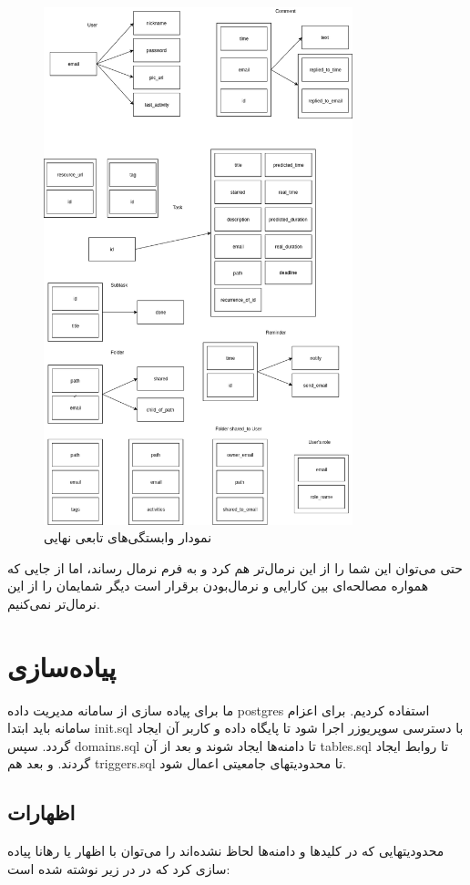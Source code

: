 \documentclass{article}
\begin{document}
\begin{figure}[H]
  \centering  
  \includegraphics[width = 0.8\textwidth]{Fucntional_Dependancy2.png}
  \caption{نمودار وابستگی‌های تابعی نهایی}
  \label{fig:fd2}
\end{figure}
حتی می‌توان این شما را از این نرمال‌تر هم کرد و به فرم نرمال  رساند، اما از جایی که همواره مصالحه‌ای بین کارایی و نرمال‌بودن برقرار است دیگر شمایمان را از این نرمال‌تر نمی‌کنیم.
\section*{پیاده‌سازی}
ما برای پیاده سازی از سامانه مدیریت داده postgres استفاده کردیم. برای اعزام سامانه باید ابتدا init.sql با دسترسی سوپریوزر اجرا شود تا پایگاه داده و کاربر آن ایجاد گردد. سپس domains.sql تا دامنه‌ها ایجاد شوند و بعد از آن tables.sql تا روابط ایجاد گردند. و بعد هم triggers.sql تا محدودیتهای جامعیتی اعمال شود.
\subsection*{اظهارات}
محدودیتهایی که در کلیدها و دامنه‌ها لحاظ نشده‌اند را می‌توان با اظهار یا رهانا پیاده سازی کرد که در در زیر نوشته شده است:
\end{document}
